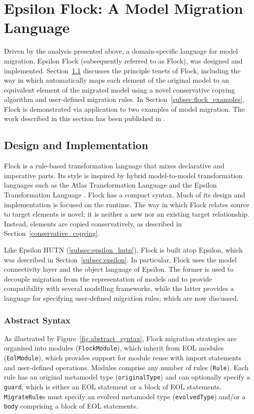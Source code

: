 
\section{Epsilon Flock: A Model Migration Language}
\label{sec:flock}
Driven by the analysis presented above, a domain-specific language for model migration, Epsilon Flock (subsequently referred to as Flock), was designed and implemented. Section~\ref{subsec:flock_design} discusses the principle tenets of Flock, including the way in which automatically maps each element of the original model to an equivalent element of the migrated model using a novel conservative copying algorithm and user-defined migration rules. In Section~\ref{subsec:flock_examples}, Flock is demonstrated via application to two examples of model migration. The work described in this section has been published in \cite{rose10flock}.


\subsection{Design and Implementation}
\label{subsec:flock_design}
Flock is a rule-based transformation language that mixes declarative and imperative parts. Its style is inspired by hybrid model-to-model transformation languages such as the Atlas Transformation Language \cite{jouault05transforming} and the Epsilon Transformation Language \cite{kolovos08etl}. Flock has a compact syntax. Much of its design and implementation is focused on the runtime. The way in which Flock relates source to target elements is novel; it is neither a new nor an existing target relationship. Instead, elements are copied conservatively, as described in Section~\ref{conservative_copying}.

Like Epsilon HUTN (\ref{subsec:epsilon_hutn}), Flock is built atop Epsilon, which was described in Section~\ref{subsec:epsilon}. In particular, Flock uses the model connectivity layer and the object language of Epsilon. The former is used to decouple migration from the representation of models and to provide compatibility with several modelling frameworks, while the latter provides a language for specifying user-defined migration rules, which are now discussed. 

\subsubsection{Abstract Syntax}
\label{subsubsec:abstract_syntax}
As illustrated by Figure~\ref{fig:abstract_syntax}, Flock migration strategies are organised into modules (\texttt{Fl\-ockMo\-du\-le}), which inherit from EOL modules (\texttt{Eo\-lMod\-ule}), which provides support for module reuse with import statements and user-defined operations. Modules comprise any number of rules (\texttt{Ru\-le}). Each rule has an original metamodel type (\texttt{or\-ig\-in\-alTy\-pe}) and can optionally specify a \texttt{gu\-ard}, which is either an EOL statement or a block of EOL statements. \texttt{Mi\-gr\-ateRu\-le}s must specify an evolved metamodel type (\texttt{ev\-ol\-vedTy\-pe}) and/or a \texttt{bo\-dy} comprising a block of EOL statements.

